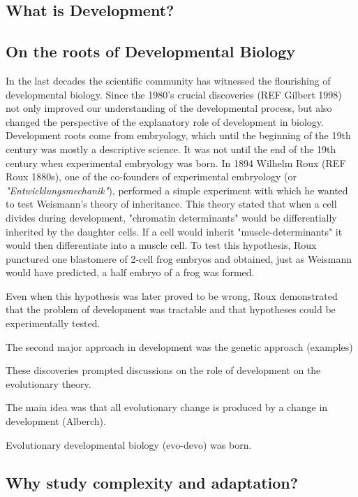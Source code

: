 
\subsection{What is Development?}


\subsection{On the roots of Developmental Biology}

In the last decades the scientific community has witnessed the flourishing of developmental biology.
Since the 1980's crucial discoveries (REF Gilbert 1998) not only improved our understanding of the developmental process, but also changed the perspective of the explanatory role of development in biology.
Development roots come from embryology, which until the beginning of the 19th century was mostly a descriptive science.
It was not until the end of the 19th century when experimental embryology was born. In 1894 Wilhelm Roux (REF Roux 1880s), one of the co-founders of experimental embryology (or \textit{"Entwicklungsmechanik"}), performed a simple experiment with which he wanted to test Weismann's theory of inheritance.
This theory stated that when a cell divides during development, "chromatin determinants" would be differentially inherited by the daughter cells. If a cell would inherit "muscle-determinants" it would then differentiate into a muscle cell.
To test this hypothesis, Roux punctured one blastomere of 2-cell frog embryos and obtained, just as Weismann would have predicted, a half embryo of a frog was formed.

Even when this hypothesis was later proved to be wrong, Roux demonstrated that the problem of development was tractable and that hypotheses could be experimentally tested.

The second major approach in development was the genetic approach (examples)

These discoveries prompted discussions on the role of development on the evolutionary theory.

The main idea was that all evolutionary change is produced by a change in development (Alberch).

Evolutionary developmental biology (evo-devo) was born.



\subsection{Why study complexity and adaptation?}

